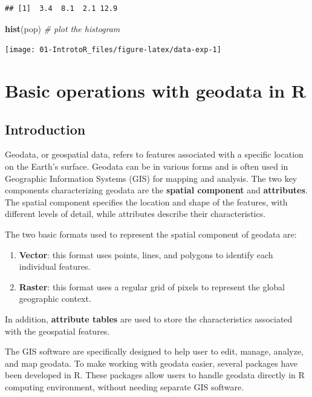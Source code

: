 \documentclass[
]{article}
\newenvironment{Shaded}{\begin{snugshade}}{\end{snugshade}}
\newcommand{\CommentTok}[1]{\textcolor[rgb]{0.56,0.35,0.01}{\textit{#1}}}
\newcommand{\FunctionTok}[1]{\textcolor[rgb]{0.13,0.29,0.53}{\textbf{#1}}}
\newcommand{\NormalTok}[1]{#1}
\providecommand{\tightlist}{%
  \setlength{\itemsep}{0pt}\setlength{\parskip}{0pt}}
\begin{document}
\begin{verbatim}
## [1]  3.4  8.1  2.1 12.9
\end{verbatim}

\begin{Shaded}
\begin{Highlighting}[]
\FunctionTok{hist}\NormalTok{(pop) }\CommentTok{\# plot the histogram}
\end{Highlighting}
\end{Shaded}

\begin{center}\texttt{[image: 01-IntrotoR\_files/figure-latex/data-exp-1]} \end{center}

\section{Basic operations with geodata in R}\label{geodata}

\subsection{Introduction}\label{introduction}

Geodata, or geospatial data, refers to features associated with a specific location on the Earth's surface. Geodata can be in various forms and is often used in Geographic Information Systems (GIS) for mapping and analysis. The two key components characterizing geodata are the \textbf{spatial component} and \textbf{attributes}. The spatial component specifies the location and shape of the features, with different levels of detail, while attributes describe their characteristics.

The two basic formats used to represent the spatial component of geodata are:

\begin{enumerate}
\def\labelenumi{\arabic{enumi}.}
\tightlist
\item
  \textbf{Vector}: this format uses points, lines, and polygons to identify each individual features.
\item
  \textbf{Raster}: this format uses a regular grid of pixels to represent the global geographic context.
\end{enumerate}

In addition, \textbf{attribute tables} are used to store the characteristics associated with the geospatial features.

The GIS software are specifically designed to help user to edit, manage, analyze, and map geodata. To make working with geodata easier, several packages have been developed in R. These packages allow users to handle geodata directly in R computing environment, without needing separate GIS software.
\end{document}

